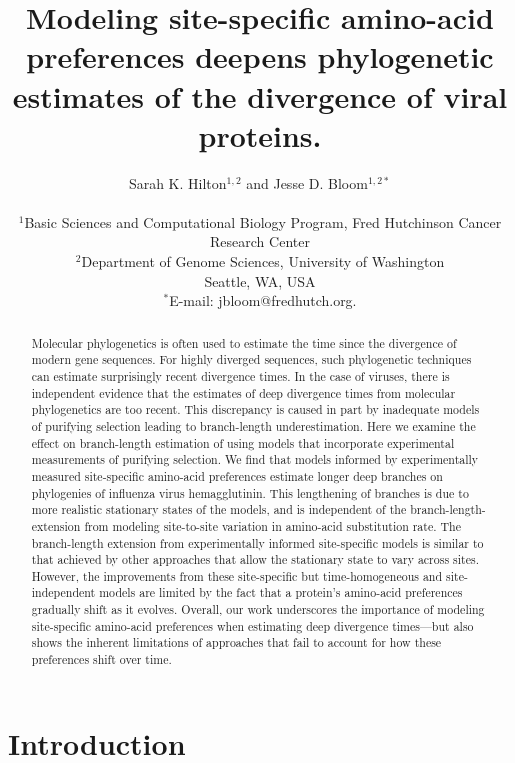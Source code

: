 \documentclass[11pt]{article}
\title{Modeling site-specific amino-acid preferences deepens phylogenetic estimates of the divergence of viral proteins.}
\author
{Sarah K. Hilton$^{1,2}$  and Jesse D. Bloom$^{1,2*}$\\
\\
\footnotesize{$^1$Basic Sciences and Computational Biology Program, Fred Hutchinson Cancer Research Center}\\
\footnotesize{$^2$Department of Genome Sciences, University of Washington}\\
\footnotesize{Seattle, WA, USA}\\
\footnotesize{$^*$E-mail:  jbloom@fredhutch.org.}\\
}
\date{}
\begin{document}
 


\maketitle 


\begin{abstract}
\noindent  
Molecular phylogenetics is often used to estimate the time since the divergence of modern gene sequences.
For highly diverged sequences, such phylogenetic techniques can estimate surprisingly recent divergence times. 
In the case of viruses, there is independent evidence that the estimates of deep divergence times from molecular phylogenetics are too recent.
This discrepancy is caused in part by inadequate models of purifying selection leading to branch-length underestimation.
Here we examine the effect on branch-length estimation of using models that incorporate experimental measurements of purifying selection.
We find that models informed by experimentally measured site-specific amino-acid preferences estimate longer deep branches on phylogenies of influenza virus hemagglutinin.
This lengthening of branches is due to more realistic stationary states of the models, and is independent of the branch-length-extension from modeling site-to-site variation in amino-acid substitution rate.
The branch-length extension from experimentally informed site-specific models is similar to that achieved by other approaches that allow the stationary state to vary across sites.
However, the improvements from these site-specific but time-homogeneous and site-independent models are limited by the fact that a protein's amino-acid preferences gradually shift as it evolves.
Overall, our work underscores the importance of modeling site-specific amino-acid preferences when estimating deep divergence times---but also shows the inherent limitations of approaches that fail to account for how these preferences shift over time. 
\end{abstract}

\clearpage

\section*{Introduction} 
\end{document}
